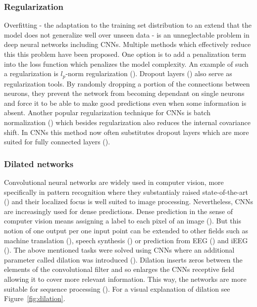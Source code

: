 \subsubsection{Regularization}
Overfitting - the adaptation to the training set distribution to an extend that the model does not generalize well over unseen data - is an unneglectable problem in deep neural networks including CNNs.
Multiple methods which effectively reduce this this problem have been proposed.
One option is to add a penalization term into the loss function which penalizes the model complexity.
An example of such a regularization is $l_p$-norm regularization (\cite{cnn-description}).
Dropout layers (\cite{drop-out}) also serve as regularization tools. 
By randomly dropping a portion of the connections between neurons, they prevent the network from becoming dependant on single neurons and force it to be able to make good predictions even when some information is absent.
Another popular regularization technique for CNNs is batch normalization (\cite{batch-norm}) which besides regularization also reduces the internal covariance shift. 
In CNNs this method now often substitutes dropout layers which are more suited for fully connected layers (\cite{cnn-description}).


\subsubsection{Dilated networks}
Convolutional neural networks are widely used in computer vision, more specifically in pattern recognition where they substantialy raised state-of-the-art (\cite{alexnet, dnn-computer-vision}) and their localized focus is well suited to image processing.
Nevertheless, CNNs are increasingly used for dense predictions.
Dense prediction in the sense of computer vision means assigning a label to each pixel of an image (\cite{dense-prediction-images}).
But this notion of one output per one input point can be extended to other fields such as machine translation (\cite{dense-prediction-machine-translation}), speech synthesis (\cite{wavenet}) or prediction from EEG (\cite{schirrmeister-deep-2017}) and iEEG (\cite{Hammer-2021}).
The above mentioned tasks were solved using CNNs where an additional parameter called dilation was introduced (\cite{dense-prediction-images}).
Dilation inserts zeros between the elements of the convolutional filter and so enlarges the CNNs receptive field allowing it to cover more relevant information.
This way, the networks are more suitable for sequence processing (\cite{cnn-description}).
For a visual explanation of dilation see Figure~\ref{fig:dilation}.

